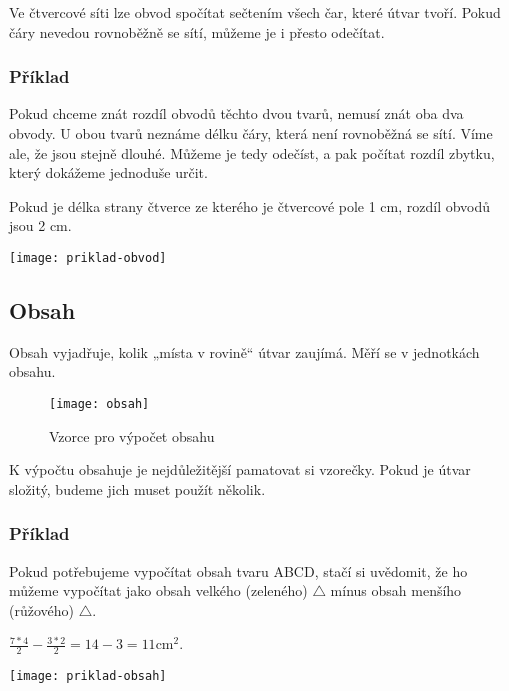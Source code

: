 Ve čtvercové síti lze obvod spočítat sečtením všech čar, které útvar tvoří. Pokud čáry nevedou rovnoběžně se sítí, můžeme je i přesto odečítat.

\subsubsection{Příklad}
\begin{minipage}[t]{\linewidth}
    Pokud chceme znát rozdíl obvodů těchto dvou tvarů, nemusí znát oba dva obvody. U obou tvarů neznáme délku čáry, která není rovnoběžná se sítí. Víme ale, že jsou stejně dlouhé. Můžeme je tedy odečíst, a pak počítat rozdíl zbytku, který dokážeme jednoduše určit.

    Pokud je délka strany čtverce ze kterého je čtvercové pole 1 cm, rozdíl obvodů jsou 2 cm.
    \begin{center}
        \texttt{[image: priklad-obvod]}
    \end{center}
\end{minipage}

\subsection{Obsah}
Obsah vyjadřuje, kolik „místa v rovině“ útvar zaujímá. Měří se v jednotkách obsahu.~\cite{umim_mat}
\begin{figure}[p]
    \caption{Vzorce pro výpočet obsahu~\cite{umim_mat}}
    \centering
    \texttt{[image: obsah]}
\end{figure}


K výpočtu obsahuje je nejdůležitější pamatovat si vzorečky. Pokud je útvar složitý, budeme jich muset použít několik.

\subsubsection{Příklad}
\begin{minipage}[t]{\linewidth}
    Pokud potřebujeme vypočítat obsah tvaru ABCD, stačí si uvědomit, že ho můžeme vypočítat jako obsah velkého (zeleného) $\triangle$ mínus obsah menšího (růžového) $\triangle$.

    $ \frac{7*4}{2} - \frac{3*2}{2} =  14 - 3 = 11 \text{cm}^{2}$.
    \begin{center}
        \texttt{[image: priklad-obsah]}
    \end{center}
\end{minipage}

